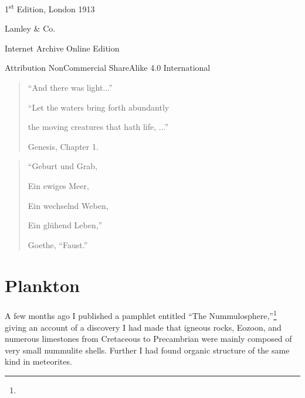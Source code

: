 \documentclass[a4paper, 12pt, oneside]{article}
\begin{document}
\begin{titlepage}
	
		
	\vspace*{\fill}%
	
	1\textsuperscript{st} Edition, London 1913 %
	
	{\small Lamley \& Co. } %

	\vspace{1\baselineskip} %

    Internet Archive Online Edition  %
	
	{\small Attribution NonCommercial ShareAlike 4.0 International } %
\end{titlepage}
\pagestyle{fancy}
\fancyhf{}
\cfoot{\Fontauri{\thepage}}
\Large
\vspace*{\fill}
\begin{quote} 
``And there was light...''

``Let the waters bring forth abundantly

the moving creatures that hath life, ...''

Genesis, Chapter 1. 
\end{quote}
\vspace{2\baselineskip}
\begin{quote} 
``Geburt und Grab,

Ein ewiges Meer,

Ein wechselnd Weben,

Ein glühend Leben,''

Goethe, ``Faust.''
\end{quote}
\vspace*{\fill}
\clearpage
\setlength{\parskip}{1mm plus1mm minus1mm}
\setcounter{tocdepth}{3}
\setcounter{secnumdepth}{3}
\tableofcontents
\clearpage
\section{Plankton}
\paragraph{}
A few months ago I published a pamphlet entitled ``The Nummulosphere,''\footnote{} giving an account of a discovery I had made that igneous rocks, Eozoon, and numerous limestones from Cretaceous to Precambrian were mainly composed of very small nummulite shells. Further I had found organic structure of the same kind in meteorites.
\end{document}
